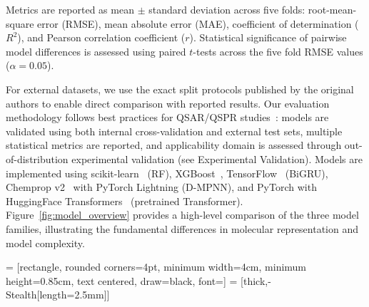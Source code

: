 \documentclass[journal=jcisd8,manuscript=article]{achemso}
\begin{document}
Metrics are reported as mean $\pm$ standard deviation across five folds: root-mean-square error (RMSE), mean absolute error (MAE), coefficient of determination ($R^2$), and Pearson correlation coefficient ($r$).
Statistical significance of pairwise model differences is assessed using paired $t$-tests across the five fold RMSE values ($\alpha = 0.05$).

For external datasets, we use the exact split protocols published by the original authors to enable direct comparison with reported results.
Our evaluation methodology follows best practices for QSAR/QSPR studies~\cite{tropsha2006best, cherkasov2014qsar}: models are validated using both internal cross-validation and external test sets, multiple statistical metrics are reported, and applicability domain is assessed through out-of-distribution experimental validation (see Experimental Validation).
Models are implemented using scikit-learn~\cite{pedregosa2011scikit} (RF), XGBoost~\cite{chen2016xgboost}, TensorFlow~\cite{abadi2016tensorflow} (BiGRU), Chemprop v2~\cite{yangAnalyzingLearnedMolecular2019} with PyTorch Lightning (D-MPNN), and PyTorch with HuggingFace Transformers~\cite{chithrananda2020chemberta} (pretrained Transformer).
Figure~\ref{fig:model_overview} provides a high-level comparison of the three model families, illustrating the fundamental differences in molecular representation and model complexity.


 = [rectangle, rounded corners=4pt, minimum width=4cm, minimum height=0.85cm, text centered, draw=black, font=\small]
 = [thick,-{Stealth[length=2.5mm]}]
\end{document}
